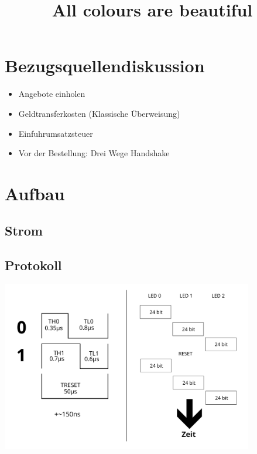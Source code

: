 \documentclass{beamer}
\title{All colours are beautiful}
\institute{MetaMeute}
\begin{document}
\begin{frame}
 \maketitle
\end{frame}

\section{Bezugsquellendiskussion}
\begin{frame}
\begin{itemize}
 \item Angebote einholen
 \item Geldtransferkosten (Klassische Überweisung)
 \item Einfuhrumsatzsteuer
 \item Vor der Bestellung: Drei Wege Handshake
\end{itemize}
\end{frame}

\section{Aufbau}
\subsection{Strom}
\begin{frame}
\end{frame}

\subsection{Protokoll}
\begin{frame}
\begin{center}
 \includegraphics[width=11cm]{protokoll}
\end{center}
\end{frame}
\end{document}
